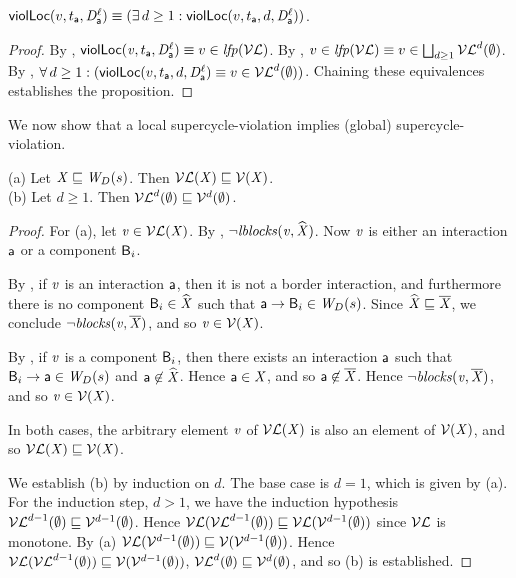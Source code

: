 \begin{proposition}
\label{prop:locViol-equiv-locViolDist}
$\scVL{v}{t_\act}{\act}{\l} \ev (\ex d \ge 1: \scVLd{v}{d}{t_\act}{\act}{\l})$.
\end{proposition}
%
\begin{proof}
By , $\scVL{\ndv}{t_\act}{\act}{\l} \ev v \in \lfp{\lVFs}$.
By , $v \in \lfp{\lVFs} \ev v \in \JOIN_{d \ge 1} \lVFs^{d} (\ewfg)$.
By , $\fa d \ge 1: (\scVLd{v}{d}{t_\act}{\act}{\l} \ev v \in \lVFs^{d} (\ewfg))$.
Chaining these equivalences establishes the proposition.
\end{proof}


We now show that a local supercycle-violation implies (global) supercycle-violation.

\begin{proposition}
\label{prop:lV-subg-V}
(a) Let $\XS \subg \lwfg{B}{s}{\DS}$. Then $\lVF{\XS} \subg \VF{\XS}$.\\
(b) Let $d \ge 1$. Then $\lVFs^{d} (\ewfg) \subg \VFs^{d} (\ewfg)$.
\end{proposition}
%
\begin{proof}
For (a), let $\ndv \in \lVF{\XS}$. By , $\neg \lblocks{\ndv}{\complL{\XS}}$.
Now $\ndv$ is either an interaction $\act$ or a component $\B_i$. 

By , if $\ndv$ is an interaction $\act$, then it is not a border interaction, and furthermore there is no
component $\B_i \in \complL{\XS}$ such that $\act \ar \B_i \in \lwfg{\B}{s}{\DS}$. 
Since $\complL{\XS} \subg \compl{\XS}$, we conclude $\neg \blocks{\ndv}{\compl{\XS}}$, and so $\ndv \in \VF{\XS}$.

By , if $\ndv$ is a component $\B_i$, then there exists an interaction $\act$ such that 
$\B_i \ar \act \in \lwfg{\B}{s}{\DS}$ and $\act \not\in \complL{\XS}$. Hence $\act \in \XS$, and so $\act \not\in \compl{\XS}$.
Hence  $\neg \blocks{\ndv}{\compl{\XS}}$, and so $\ndv \in \VF{\XS}$.

In both cases, the arbitrary element $\ndv$ of $\lVF{\XS}$ is also an element of $\VF{\XS}$, and so $\lVF{\XS} \subg \VF{\XS}$.

We establish (b) by induction on $d$. The base case is $d=1$, which is given by (a).
For the induction step, $d > 1$, we have the induction hypothesis $\lVFs^{d-1} (\ewfg) \subg \VFs^{d-1} (\ewfg)$. 
Hence $\lVF{\lVFs^{d-1} (\ewfg)} \subg \lVF{\VFs^{d-1} (\ewfg)}$ since $\lVFs$ is monotone.
By (a) $\lVF{\VFs^{d-1} (\ewfg)} \subg \VF{\VFs^{d-1} (\ewfg)}$. 
Hence  $\lVF{\lVFs^{d-1} (\ewfg)} \subg \VF{\VFs^{d-1} (\ewfg)}$, \ie
  $\lVFs^{d} (\ewfg) \subg \VFs^{d} (\ewfg)$, and so (b) is established.
\end{proof}


